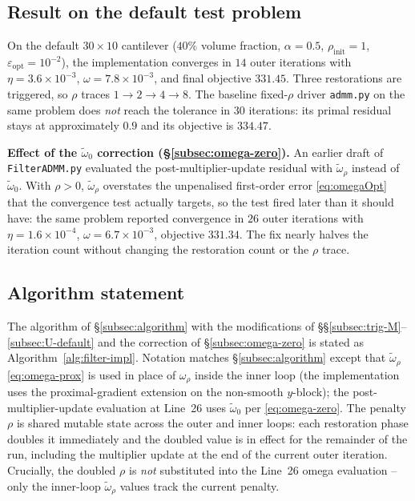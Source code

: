\documentclass[11pt]{article}
\begin{document}
\subsection{Result on the default test problem}\label{subsec:result}

On the default $30\times10$ cantilever ($40\%$ volume fraction, $\alpha = 0.5$, $\rho_{\mathrm{init}} = 1$, $\varepsilon_{\mathrm{opt}} = 10^{-2}$), the implementation converges in $14$ outer iterations with $\eta = 3.6\times10^{-3}$, $\omega = 7.8\times10^{-3}$, and final objective $331.45$. Three restorations are triggered, so $\rho$ traces $1 \to 2 \to 4 \to 8$. The baseline fixed-$\rho$ driver \texttt{admm.py} on the same problem does \emph{not} reach the tolerance in $30$ iterations: its primal residual stays at approximately $0.9$ and its objective is $334.47$.

\medskip
\noindent\textbf{Effect of the $\widetilde{\omega}_0$ correction (\S\ref{subsec:omega-zero}).} An earlier draft of \texttt{FilterADMM.py} evaluated the post-multiplier-update residual with $\widetilde{\omega}_\rho$ instead of $\widetilde{\omega}_0$. With $\rho > 0$, $\widetilde{\omega}_\rho$ overstates the unpenalised first-order error \eqref{eq:omegaOpt} that the convergence test actually targets, so the test fired later than it should have: the same problem reported convergence in $26$ outer iterations with $\eta = 1.6\times10^{-4}$, $\omega = 6.7\times10^{-3}$, objective $331.34$. The fix nearly halves the iteration count without changing the restoration count or the $\rho$ trace.

\subsection{Algorithm statement}\label{subsec:implemented-algorithm}

The algorithm of \S\ref{subsec:algorithm} with the modifications of \S\S\ref{subsec:trig-M}--\ref{subsec:U-default} and the correction of \S\ref{subsec:omega-zero} is stated as Algorithm~\ref{alg:filter-impl}. Notation matches \S\ref{subsec:algorithm} except that $\widetilde{\omega}_\rho$ \eqref{eq:omega-prox} is used in place of $\omega_\rho$ inside the inner loop (the implementation uses the proximal-gradient extension on the non-smooth $y$-block); the post-multiplier-update evaluation at Line~26 uses $\widetilde{\omega}_0$ per \eqref{eq:omega-zero}. The penalty $\rho$ is shared mutable state across the outer and inner loops: each restoration phase doubles it immediately and the doubled value is in effect for the remainder of the run, including the multiplier update at the end of the current outer iteration. Crucially, the doubled $\rho$ is \emph{not} substituted into the Line~26 omega evaluation -- only the inner-loop $\widetilde{\omega}_\rho$ values track the current penalty.
\end{document}
